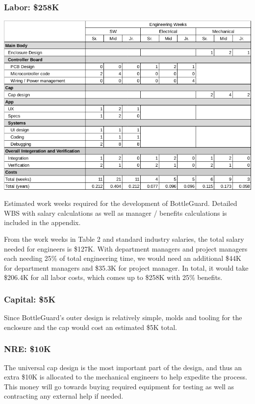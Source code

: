 \documentclass[12pt]{article}
\begin{document}
	\subsubsection*{Labor: \$258K}
		\begin{table}[H]
		\includegraphics[width=\textwidth]{wbs_small.png}

		\caption{Estimated work weeks required for the development of BottleGuard. Detailed WBS with salary calculations as well as manager / benefits calculations is included in the appendix.}
	\end{table}
From the work weeks in Table 2 and standard industry salaries, the total salary needed for engineers is \$127K. With department managers and project managers each needing 25\% of total engineering time, we would need an additional \$44K for department managers and \$35.3K for project manager. In total, it would take \$206.4K for all labor costs, which comes up to \$258K with 25\% benefits.
	\subsubsection*{Capital: \$5K}
Since BottleGuard’s outer design is relatively simple, molds and tooling for the enclosure and the cap would cost an estimated \$5K total.
	\subsubsection*{NRE: \$10K}
	The universal cap design is the most important part of the design, and thus an extra \$10K is allocated to the mechanical engineers to help expedite the process. This money will go towards buying required equipment for testing as well as contracting any external help if needed.
	
\end{document}
